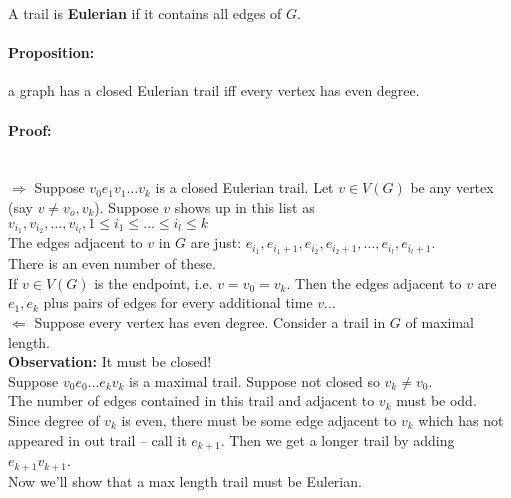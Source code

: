 \documentclass[a4paper, 11pt, twoside]{article}
\begin{document}
A trail is \textbf{Eulerian} if it contains all edges of $G$.\\

\paragraph{Proposition:} a graph has a closed Eulerian trail iff every vertex has even degree.

\paragraph{Proof:}\ \\

$\Longrightarrow$ Suppose $v_0e_1v_1\dots v_k$ is  a closed Eulerian trail. Let $v\in V(G)$ be any vertex (say $v\not= v_o, v_k$). Suppose $v$ shows up in this list as $v_{i_1}, v_{i_2}, \dots, v_{i_l}, 1\leq i_1\leq \dots \leq i_l\leq k$\\

The edges adjacent to $v$ in $G$ are just: $e_{i_1}, e_{i_1+1}, e_{i_2}, e_{i_2+1}, \dots, e_{i_l}, e_{i_l+1}$.\\

There is an even number of these.\\

If $v\in V(G)$ is the endpoint, i.e. $v=v_0=v_k$. Then the edges adjacent to $v$ are $e_1, e_k$ plus pairs of edges for every additional time $v$...\\

$\Longleftarrow$ Suppose every vertex has even degree. Consider a trail in $G$ of maximal length.\\

\textbf{Observation:} It must be closed!\\

Suppose $v_0e_0\dots e_kv_k$ is a maximal trail. Suppose not closed so $v_k\not=v_0$.\\

The number of edges contained in this trail and adjacent to $v_k$ must be odd.\\

Since degree of $v_k$ is even, there must be some edge adjacent to $v_k$ which has not appeared in out trail -- call it $e_{k+1}$. Then we get a longer trail by adding $e_{k+1}v_{k+1}$.\\

Now we'll show that a max length trail must be Eulerian.\\
\end{document}
